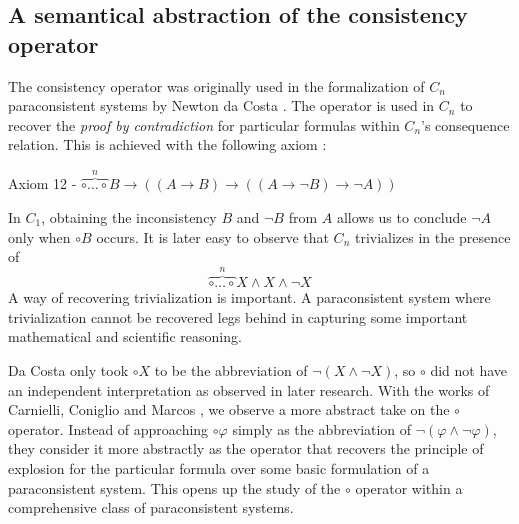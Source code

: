 \documentclass{amsart}
\newcommand{\so}{\rightarrow}
\begin{document}
\subsection{A semantical abstraction of the consistency operator}

The consistency operator was originally used in the formalization of $C_n$ paraconsistent systems by Newton da Costa \cite{da_costa_theory_1974, costa_sistemas_1993}. The operator is used in $C_n$ to recover the \textit{proof by contradiction} for particular formulas within $C_n$'s consequence relation. This is achieved with the following axiom \cite[p. 499]{da_costa_theory_1974}:
\begin{center}
    Axiom 12 - $\overbrace{\circ \ldots \circ}^n B \so ((A \so B) \so ((A \so \lnot B) \so \lnot A))$
\end{center}
In $C_1$, obtaining the inconsistency $B$ and $\lnot B$ from $A$ allows us to conclude $\lnot A$ only when $\circ B$ occurs. It is later easy to observe that $C_n$ trivializes in the presence of 
$$\overbrace{\circ \ldots \circ}^n X \land X \land \lnot X$$
A way of recovering trivialization is important. A paraconsistent system where trivialization cannot be recovered legs behind in capturing some important mathematical and scientific reasoning. 

Da Costa only took $\circ X$ to be the abbreviation of $\lnot (X \land \lnot X)$, so $\circ$ did not have an independent interpretation as observed in later research. 
With the works of Carnielli, Coniglio and Marcos \cite{marcos_logics_2005, carnielli_logics_2007}, we observe a more abstract take on the $\circ$ operator. Instead of approaching $\circ \varphi$ simply as the abbreviation of $\lnot (\varphi \land \lnot \varphi)$, they consider it more abstractly as the operator that recovers the principle of explosion for the particular formula over some basic formulation of a paraconsistent system. 
This opens up the study of the $\circ$ operator within a comprehensive class of paraconsistent systems.
\end{document}
